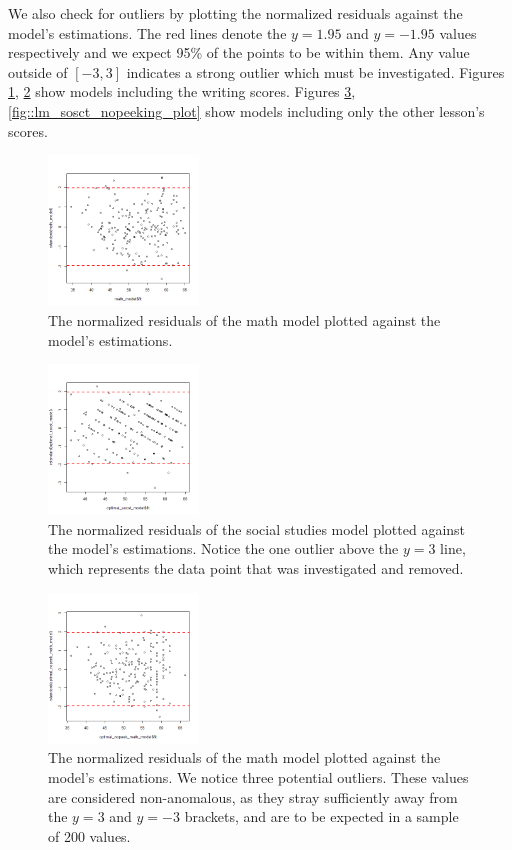 \documentclass[10pt, a4paper]{article}
\begin{document}
	We also check for outliers by plotting the normalized residuals against the model's estimations. The red lines denote the $y=1.95$ and $y=-1.95$ values respectively and we expect 95\% of the points to be within them. Any value outside of $[-3,3]$ indicates a strong outlier which must be investigated. Figures \ref{fig::lm_math_plot}, \ref{fig::lm_socst_plot} show models including the writing scores. Figures \ref{fig::lm_math_nopeeking_plot}, \ref{fig::lm_sosct_nopeeking_plot} show models including only the other lesson's scores.
	
	 \begin{figure}
	 	\includegraphics[width=4cm]{lm_math_residual_plot.png}
	 	\centering
	 	\caption{The normalized residuals of the math model plotted against the model's estimations.}
	 	\label{fig::lm_math_plot}
	 \end{figure}
 
	 \begin{figure}
	 	\includegraphics[width=4cm]{lm_socst_residual_plot.png}
	 	\centering
	 	\caption{The normalized residuals of the social studies model plotted against the model's estimations. Notice the one outlier above the $y=3$ line, which represents the data point that was investigated and removed.}
	 	\label{fig::lm_socst_plot}
	 \end{figure}
 
	 \begin{figure}
	 	\includegraphics[width=4cm]{lm_math_nopeeking_residual_plot.png}
	 	\centering
	 	\caption{The normalized residuals of the math model plotted against the model's estimations. We notice three potential outliers. These values are considered non-anomalous, as they stray sufficiently away from the $y=3$ and $y=-3$ brackets, and are to be expected in a sample of 200 values.}
	 	\label{fig::lm_math_nopeeking_plot}
	 \end{figure}
 
\end{document}
